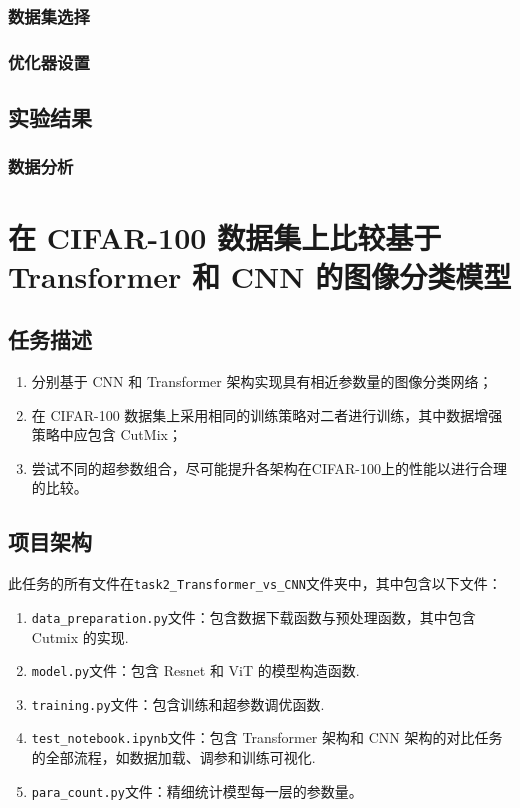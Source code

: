 \documentclass[notitlepage,cs4size,punct,oneside]{ctexrep}
\numberwithin{equation}{chapter}
\theoremstyle{mystyle}
\begin{document}
\subsection{数据集选择}

\subsection{优化器设置}

\section{实验结果}
\subsection{数据分析}

\chapter{在 CIFAR-100 数据集上比较基于 Transformer 和 CNN 的图像分类模型}
\section{任务描述}
\begin{enumerate}
\item 分别基于 CNN 和 Transformer 架构实现具有相近参数量的图像分类网络；
\item 在 CIFAR-100 数据集上采用相同的训练策略对二者进行训练，其中数据增强策略中应包含 CutMix；
\item 尝试不同的超参数组合，尽可能提升各架构在CIFAR-100上的性能以进行合理的比较。
\end{enumerate}


\section{项目架构}
此任务的所有文件在\texttt{task2\_Transformer\_vs\_CNN}文件夹中，其中包含以下文件：
\begin{enumerate}
\item \texttt{data\_preparation.py}文件：包含数据下载函数与预处理函数，其中包含 Cutmix 的实现.
\item \texttt{model.py}文件：包含 Resnet 和 ViT 的模型构造函数.
\item \texttt{training.py}文件：包含训练和超参数调优函数.
\item \texttt{test\_notebook.ipynb}文件：包含 Transformer 架构和 CNN 架构的对比任务的全部流程，如数据加载、调参和训练可视化.
\item \texttt{para\_count.py}文件：精细统计模型每一层的参数量。
\end{enumerate}
\end{document}
